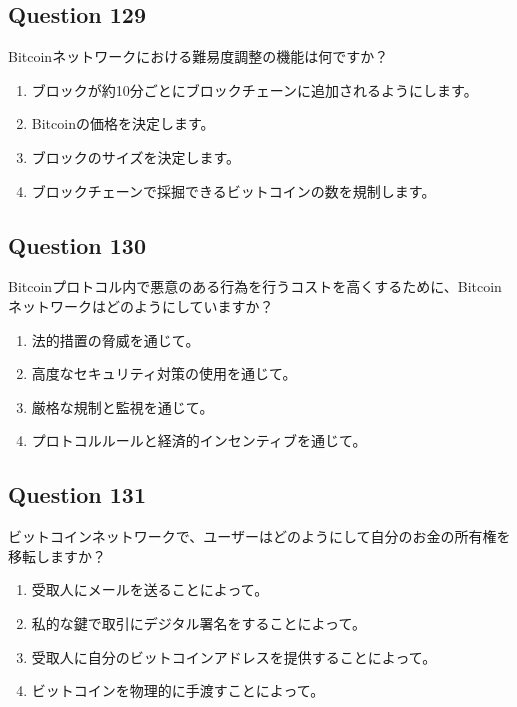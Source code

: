 \documentclass[12pt,a4paper]{article}
\begin{document}
\bigskip


\subsection*{Question 129}
Bitcoinネットワークにおける難易度調整の機能は何ですか？

\begin{enumerate}[label=\Alph*., leftmargin=*]
\item ブロックが約10分ごとにブロックチェーンに追加されるようにします。
\item Bitcoinの価格を決定します。
\item ブロックのサイズを決定します。
\item ブロックチェーンで採掘できるビットコインの数を規制します。
\end{enumerate}

\bigskip


\subsection*{Question 130}
Bitcoinプロトコル内で悪意のある行為を行うコストを高くするために、Bitcoinネットワークはどのようにしていますか？

\begin{enumerate}[label=\Alph*., leftmargin=*]
\item 法的措置の脅威を通じて。
\item 高度なセキュリティ対策の使用を通じて。
\item 厳格な規制と監視を通じて。
\item プロトコルルールと経済的インセンティブを通じて。
\end{enumerate}

\bigskip


\subsection*{Question 131}
ビットコインネットワークで、ユーザーはどのようにして自分のお金の所有権を移転しますか？

\begin{enumerate}[label=\Alph*., leftmargin=*]
\item 受取人にメールを送ることによって。
\item 私的な鍵で取引にデジタル署名をすることによって。
\item 受取人に自分のビットコインアドレスを提供することによって。
\item ビットコインを物理的に手渡すことによって。
\end{enumerate}
\end{document}

